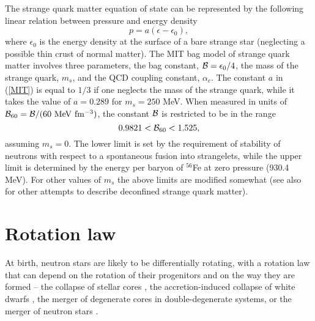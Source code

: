 \documentclass[12pt]{article}
\begin{document}
The strange quark matter equation of state can be represented by the
following linear relation between pressure and energy density
\begin{equation}
p=a(\epsilon-\epsilon_0),
\label{MIT}
\end{equation}
where $\epsilon_0$ is the energy density at the surface of a bare
strange star (neglecting a possible thin crust of normal matter).  The
MIT bag model of strange quark matter involves three parameters, the
bag constant, ${\cal B}=\epsilon_0/4$, the mass of the strange quark,
$m_s$, and the QCD coupling constant, $\alpha_c$.  The constant $a$ in
(\ref{MIT}) is equal to $1/3$ if one neglects the mass of the strange
quark, while it takes the value of $a=0.289$ for $m_s=250$ MeV. When
measured in units of ${\cal B}_{60}={\cal B}/(60~{\rm MeV~fm^{-3}})$,
the constant ${\cal B}$ is restricted to be in the range
\begin{equation}
0.9821<{\cal B}_{60}<1.525,
\end{equation}
assuming $m_s=0$.  
The lower limit is set by the requirement of
stability of neutrons with respect to a spontaneous fusion into
strangelets, while the upper limit is determined by the energy per
baryon of ${}^{56}$Fe at zero pressure (930.4 MeV).  For other values
of $m_s$ the above limits are modified somewhat (see also 
\cite{Dey98,Gondek00} for other attempts to describe deconfined 
strange quark matter).

\vskip0.8cm
\section{Rotation law}
\label{RotEquil}

At birth, neutron stars are likely to be differentially rotating, 
with a rotation law that can depend on the rotation of their 
progenitors and on the way they are formed --  the collapse of 
stellar cores \cite{ZM97,Liu02b,AW05},
the accretion-induced collapse of white dwarfs \cite{LL01}, 
the merger of degenerate cores in double-degenerate systems, or 
the merger of neutron stars \cite{RS99,SU00,OR02,SUK02}.
\end{document}
